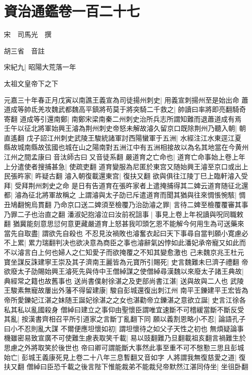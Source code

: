 \section{資治通鑑卷一百二十七}
宋　司馬光　撰

胡三省　音註

宋紀九|{
	昭陽大荒落一年}


太祖文皇帝下之下

元嘉三十年春正月戊寅以南譙王義宣為司徒揚州刺史|{
	用義宣刺揚州至是始出命}
蕭道成等帥氐羌攻魏武都魏高平鎮將苟莫于將突騎二千救之|{
	帥讀曰率將即亮翻騎奇寄翻}
道成等引還南鄭|{
	南鄭宋梁南秦二州刺史治所兵志所謂知難而退蕭道成有焉}
壬午以征北將軍始興王濬為荆州刺史帝怒未解故濬久留京口既除荆州乃聽入朝|{
	朝直遙翻}
戊子詔江州刺史武陵王駿統諸軍討西陽蠻軍于五洲|{
	水經注江水東逕江夏縣故城南縣故弦國也城在山之陽南對五洲江中有五洲相接故以為名其地當在今黄州江州之間孟康曰音汰師古曰又音徒系翻}
嚴道育之亡命也|{
	道育亡命事始上卷上年}
上分遣使者搜捕甚急|{
	使疏吏翻}
道育變服為尼匿於東宫又随始興王濬至京口或出上民張旿家|{
	旿疑古翻}
濬入朝復載還東宫|{
	復扶又翻}
欲與俱往江陵丁巳上臨軒濬入受拜|{
	受拜荆州刺史之命}
是日有告道育在張旿家者上遣掩捕得其二婢云道育随征北還都|{
	濬為征北將軍故稱之}
上謂濬與太子劭已斥遣道育而聞其猶與往來惆悵惋駭|{
	惆丑鳩翻惋烏貫翻}
乃命京口送二婢須至檢覆乃治劭濬之罪|{
	言待二婢至檢覆覆審其事乃罪二子也治直之翻}
潘淑妃抱濬泣曰汝前祝詛事|{
	事見上卷上年祝讀與呪同職敕翻}
猶冀能刻意思愆何意更藏嚴道育上怒甚我叩頭乞恩不能解今何用生為可送藥來當先自取盡|{
	謂欲先自殺也}
不忍見汝禍敗也濬奮衣起曰天下事尋自當判願小寛慮必不上累|{
	累力瑞翻判决也欲决意為商臣之事也濬辭氣凶悖如此潘妃承帝寵又如此而不以濬言白上何也婦人之仁知愛子而欲掩覆之不知其變愈激也}
己未魏京兆王杜元寶坐謀反誅建寧王崇及其子濟南王麗皆為元寶所引賜死|{
	史言魏難未巳濟子禮翻}
帝欲廢太子劭賜始興王濬死先與侍中王僧綽謀之使僧綽尋漢魏以來廢太子諸王典故|{
	典經常之籍也故舊事也}
送尚書僕射徐湛之及吏部尚書江湛|{
	送與故與二人也}
武陵王駿素無寵故屢出外藩不得留建康|{
	駿自彭城還復出刺江州}
南平王鑠建平王宏皆為帝所愛鑠妃江湛之妹随王誕妃徐湛之之女也湛勸帝立鑠湛之意欲立誕|{
	史言江徐各私其私以亂國殺身}
僧綽曰建立之事仰由聖懷臣謂唯宜速斷不可稽緩當斷不斷反受其亂|{
	按漢書齊相召平所引道家之言斷丁亂翻下同}
願以義割恩略小不忍|{
	論語孔子曰小不忍則亂大謀}
不爾便應坦懷如初|{
	謂坦懷待之如父子天性之初也}
無煩疑論事機雖密易致宣廣不可使難生慮表取笑千載|{
	易以豉翻難乃旦翻載祖亥翻言禍難生於思慮之外將取笑於後世也}
帝曰卿可謂能斷大事然此事至重不可不慇懃三思且彭城始亡|{
	彭城王義康死見上卷二十八年三息暫翻又音如字}
人將謂我無復慈愛之道|{
	復扶又翻}
僧綽曰臣恐千載之後言陛下惟能裁弟不能裁兒帝默然江湛同侍坐|{
	坐徂卧翻}
